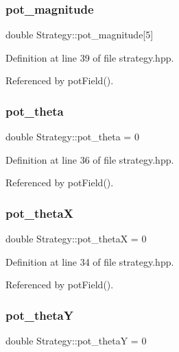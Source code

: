 \subsubsection{\texorpdfstring{pot\+\_\+magnitude}{pot\_magnitude}}
{\footnotesize\ttfamily double Strategy\+::pot\+\_\+magnitude\mbox{[}5\mbox{]}}



Definition at line 39 of file strategy.\+hpp.



Referenced by pot\+Field().

\mbox{\label{class_strategy_a6c8c8a503e17ffce2659af9e33ea86c8}} 
\subsubsection{\texorpdfstring{pot\+\_\+theta}{pot\_theta}}
{\footnotesize\ttfamily double Strategy\+::pot\+\_\+theta = 0}



Definition at line 36 of file strategy.\+hpp.



Referenced by pot\+Field().

\mbox{\label{class_strategy_a6963136ba083ba7cf239505b6a587114}} 
\subsubsection{\texorpdfstring{pot\+\_\+thetaX}{pot\_thetaX}}
{\footnotesize\ttfamily double Strategy\+::pot\+\_\+thetaX = 0}



Definition at line 34 of file strategy.\+hpp.



Referenced by pot\+Field().

\mbox{\label{class_strategy_a3318f16f937458878a810d28b99bb7a7}} 
\subsubsection{\texorpdfstring{pot\+\_\+thetaY}{pot\_thetaY}}
{\footnotesize\ttfamily double Strategy\+::pot\+\_\+thetaY = 0}



